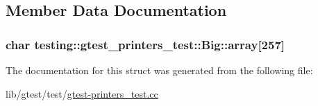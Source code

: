\subsection{Member Data Documentation}
\hypertarget{structtesting_1_1gtest__printers__test_1_1_big_a863911a8ec5c3bbe79c44d399f1de61f}{
\subsubsection[{array}]{\setlength{\rightskip}{0pt plus 5cm}char testing\-::gtest\-\_\-printers\-\_\-test\-::\-Big\-::array\mbox{[}257\mbox{]}}}\label{structtesting_1_1gtest__printers__test_1_1_big_a863911a8ec5c3bbe79c44d399f1de61f}


The documentation for this struct was generated from the following file\-:\begin{DoxyCompactItemize}
\item 
lib/gtest/test/\hyperlink{gtest-printers__test_8cc}{gtest-\/printers\-\_\-test.\-cc}\end{DoxyCompactItemize}
